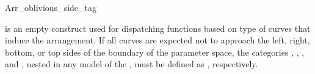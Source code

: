 
\ccRefPageBegin

\begin{ccRefClass}{Arr_oblivious_side_tag}

\ccDefinition

\ccRefName{} is an empty construct used for dispatching functions based on
type of curves that induce the arrangement. If all curves are expected not
to approach the left, right, bottom, or top sides of the boundary of the
parameter space, the categories ,
, , and
, nested in any model of the
, must be defined as \ccRefName{}, respectively.


\ccSeeAlso
    \\

\end{ccRefClass}

\ccRefPageEnd
